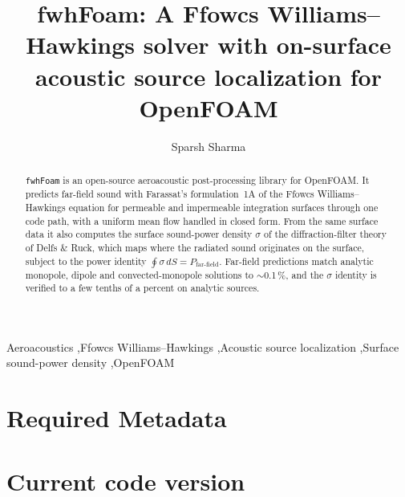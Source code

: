 \documentclass[preprint,12pt,a4paper]{elsarticle}
\begin{document}
\begin{frontmatter}

\title{fwhFoam: A Ffowcs Williams--Hawkings solver with on-surface
acoustic source localization for OpenFOAM}

\author[dlr]{Sparsh Sharma}
\address[dlr]{German Aerospace Center (DLR), Germany}

\begin{abstract}
\texttt{fwhFoam} is an open-source aeroacoustic post-processing library for
OpenFOAM. It predicts far-field sound with Farassat's formulation~1A of the
Ffowcs Williams--Hawkings equation for permeable and impermeable integration
surfaces through one code path, with a uniform mean flow handled in closed
form. From the same surface data it also computes the surface sound-power
density $\sigma$ of the diffraction-filter theory of Delfs \& Ruck, which
maps where the radiated sound originates on the surface, subject to the
power identity $\oint\sigma\,dS = P_\mathrm{far\text{-}field}$. Far-field
predictions match analytic monopole, dipole and convected-monopole solutions
to $\sim$0.1\,\%, and the $\sigma$ identity is verified to a few tenths of a
percent on analytic sources.
\end{abstract}

\begin{keyword}
Aeroacoustics \sep Ffowcs Williams--Hawkings \sep Acoustic source
localization \sep Surface sound-power density \sep OpenFOAM
\end{keyword}

\end{frontmatter}

\section*{Required Metadata}

\section*{Current code version}
\end{document}
